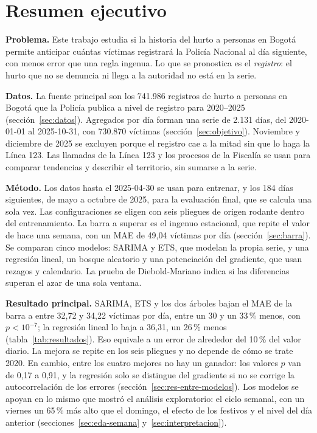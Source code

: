 \section{Resumen ejecutivo}\label{sec:resumen}

\textbf{Problema.} Este trabajo estudia si la historia del hurto a personas en Bogotá permite anticipar cuántas víctimas registrará la Policía Nacional al día siguiente, con menos error que una regla ingenua. Lo que se pronostica es el \emph{registro}: el hurto que no se denuncia ni llega a la autoridad no está en la serie.

\textbf{Datos.} La fuente principal son los 741.986 registros de hurto a personas en Bogotá que la Policía publica a nivel de registro para 2020--2025 (sección~\ref{sec:datos}). Agregados por día forman una serie de 2.131 días, del 2020-01-01 al 2025-10-31, con 730.870 víctimas (sección~\ref{sec:objetivo}). Noviembre y diciembre de 2025 se excluyen porque el registro cae a la mitad sin que lo haga la Línea 123. Las llamadas de la Línea 123 y los procesos de la Fiscalía se usan para comparar tendencias y describir el territorio, sin sumarse a la serie.

\textbf{Método.} Los datos hasta el 2025-04-30 se usan para entrenar, y los 184 días siguientes, de mayo a octubre de 2025, para la evaluación final, que se calcula una sola vez. Las configuraciones se eligen con seis pliegues de origen rodante dentro del entrenamiento. La barra a superar es el ingenuo estacional, que repite el valor de hace una semana, con un MAE de 49,04 víctimas por día (sección~\ref{sec:barra}). Se comparan cinco modelos: SARIMA y ETS, que modelan la propia serie, y una regresión lineal, un bosque aleatorio y una potenciación del gradiente, que usan rezagos y calendario. La prueba de Diebold-Mariano indica si las diferencias superan el azar de una sola ventana.

\textbf{Resultado principal.} SARIMA, ETS y los dos árboles bajan el MAE de la barra a entre 32,72 y 34,22 víctimas por día, entre un 30 y un 33\,\% menos, con $p < 10^{-7}$; la regresión lineal lo baja a 36,31, un 26\,\% menos (tabla~\ref{tab:resultados}). Eso equivale a un error de alrededor del 10\,\% del valor diario. La mejora se repite en los seis pliegues y no depende de cómo se trate 2020. En cambio, entre los cuatro mejores no hay un ganador: los valores $p$ van de 0,17 a 0,91, y la regresión solo se distingue del gradiente si no se corrige la autocorrelación de los errores (sección~\ref{sec:res-entre-modelos}). Los modelos se apoyan en lo mismo que mostró el análisis exploratorio: el ciclo semanal, con un viernes un 65\,\% más alto que el domingo, el efecto de los festivos y el nivel del día anterior (secciones~\ref{sec:eda-semana} y~\ref{sec:interpretacion}).

